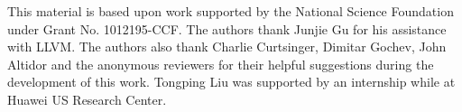 This material is based upon work supported by the National Science
Foundation under Grant No. 1012195-CCF. The authors thank Junjie Gu for his assistance with LLVM. The authors also thank Charlie Curtsinger, Dimitar Gochev, John Altidor and the anonymous reviewers for their helpful suggestions during the development of this work. Tongping Liu was supported by an internship while at Huawei US Research Center.